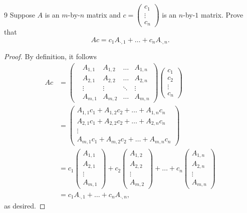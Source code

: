 \documentclass{extarticle}
\newenvironment{problem}[1]{\begin{prob*}{#1}{}}{\end{prob*}}
\begin{document}
\begin{problem}{9}
Suppose $A$ is an $m$-by-$n$ matrix and $c = \begin{pmatrix}c_1\\ \vdots \\ c_n\end{pmatrix}$ is an $n$-by-$1$ matrix.  Prove that
\begin{equation*}
Ac = c_1A_{\cdot, 1} + \dots + c_nA_{\cdot, n}.
\end{equation*}
\end{problem}
\begin{proof}
By definition, it follows
\begin{align*}
Ac &= \begin{pmatrix}
		&A_{1,1} &A_{1,2}    &\dots    &A_{1, n} \\ 
		&A_{2,1} &A_{2,2}    &\dots    &A_{2, n} \\
		&\vdots   &\vdots      & \ddots &\vdots \\ 
		&A_{m,1} &A_{m, 2} &\dots    &A_{m,n}\end{pmatrix}
		\begin{pmatrix}c_1\\ c_2\\ \vdots \\ c_n\end{pmatrix}\\
   &= \begin{pmatrix} A_{1,1}c_1 + A_{1,2}c_2 + \dots + A_{1, n}c_n \\ 
   				A_{2,1}c_1 + A_{2,2}c_2 + \dots + A_{2, n}c_n \\
				  \vdots \\ 
				A_{m,1}c_1 + A_{m,2}c_2 + \dots + A_{m, n}c_n \end{pmatrix}\\
   &= c_1\begin{pmatrix} A_{1,1}\\ A_{2,1}\\ \vdots \\ A_{m,1}\end{pmatrix} + c_2\begin{pmatrix} A_{1,2}\\ A_{2,2}\\ \vdots \\ A_{m,2}\end{pmatrix} + \dots + c_n\begin{pmatrix} A_{1,n}\\ A_{2,n}\\ \vdots \\ A_{m,n}\end{pmatrix}\\
   &= c_1A_{\cdot, 1} + \dots + c_nA_{\cdot, n},
\end{align*}
as desired.
\end{proof}
\end{document}
